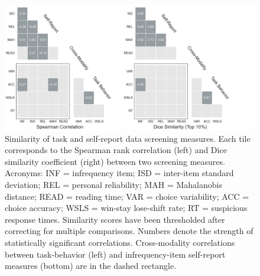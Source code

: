 \documentclass[a4paper,notitlepage,12pt]{article}
\begin{document}
\begin{refsection}[main]
\begin{figure}[!t]
\includegraphics[width=16cm, trim=0 0 3cm 0]{../figures/main_02b.png}
\centering
\captionsetup{width=0.88\textwidth}
\caption{Similarity of task and self-report data screening measures. Each tile corresponds to the Spearman rank correlation (left) and Dice similarity coefficient (right) between two screening measures. Acronyms: INF = infrequency item; ISD = inter-item standard deviation; REL = personal reliability; MAH = Mahalanobis distance; READ = reading time; VAR = choice variability; ACC = choice accuracy; WSLS = win-stay lose-shift rate; RT = suspicious response times. Similarity scores have been thresholded after correcting for multiple comparisons. Numbers denote the strength of statistically significant correlations. Cross-modality correlations between task-behavior (left) and infrequency-item self-report measures (bottom) are in the dashed rectangle.}
\label{fig:correspondence}
\end{figure}


\end{refsection}
\end{document}
